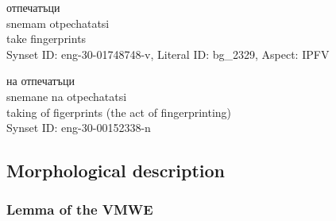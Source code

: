 \documentclass[output=paper,colorlinks,citecolor=brown]{langscibook}
\begin{document}
\begin{exe}
\ex \label{bg:technical}
\begin{xlist}
    \ex \label{bg:technical-v}
    \settowidth {}
     {отпечатъци}  \\ 
    {snemam} {otpechatatsi}  \\ 
   take fingerprints\\ 
    Synset ID: eng-30-01748748-v, 
    Literal ID: bg\_2329, Aspect: IPFV 

    \ex \label{bg:technical-n}
    \settowidth {}
     {на}  {отпечатъци} {}  \\  
    {snemane} {na} {otpechatatsi}  {} \\ 
    taking of figerprints  {(the act of fingerprinting)}\\ 
     Synset ID: eng-30-00152338-n  
\end{xlist}

\end{exe}



\subsection{Morphological description} %


\subsubsection{Lemma of the VMWE}
\end{document}
